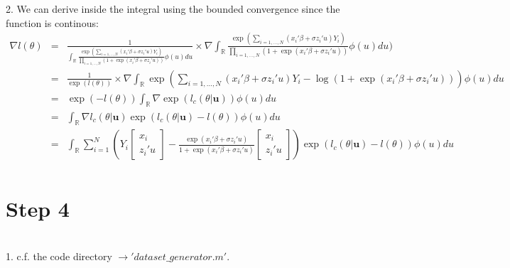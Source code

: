 2.  We can derive inside the integral using the bounded convergence since the function is continous:
\begin{eqnarray*}
	\nabla l(\theta)&=& \frac{1}{\int_{\mathbb{R}} \frac{\exp(\sum_{i=1,\dots,N}(x_i' \beta + \sigma z_i'u) Y_i)}{\prod_{i=1,\dots,N}(1+\exp(x_i' \beta + \sigma z_i'u))} \phi(u) du} \times \nabla \int_{\mathbb{R}} \frac{\exp(\sum_{i=1,\dots,N}(x_i' \beta + \sigma z_i'u) Y_i)}{\prod_{i=1,\dots,N}(1+\exp(x_i' \beta + \sigma z_i'u))} \phi(u) du)\\
						&=& \frac{1}{\exp(l(\theta))}\times \nabla \int_{\mathbb{R}} \exp(\sum_{i=1,\dots,N}(x_i' \beta + \sigma z_i'u) Y_i-\log(1+\exp(x_i' \beta + \sigma z_i'u)))\phi(u)du \\
						&=& \exp(-l(\theta)) \int_{\mathbb{R}} \nabla \exp(l_c(\theta\vert \textbf{u})) \phi(u) du\\
						&=& \int_{\mathbb{R}} \nabla l_c(\theta\vert \textbf{u}) \exp (l_c(\theta\vert \textbf{u})-l(\theta)) \phi(u)du\\
						&=& \int_{\mathbb{R}} \sum_{i=1}^{N} (Y_i\begin{bmatrix}
							x_i\\
							z_i'u
						\end{bmatrix}-\frac{\exp(x_i' \beta + \sigma z_i'u)}{1+\exp(x_i' \beta + \sigma z_i'u)}\begin{bmatrix}
						x_i\\
						z_i'u
					\end{bmatrix}) \exp (l_c(\theta\vert \textbf{u})-l(\theta)) \phi(u)du\\
\end{eqnarray*}




\section*{Step 4}
~\\

1. c.f. the code directory $\rightarrow 'dataset\_generator.m'$.\\
	

